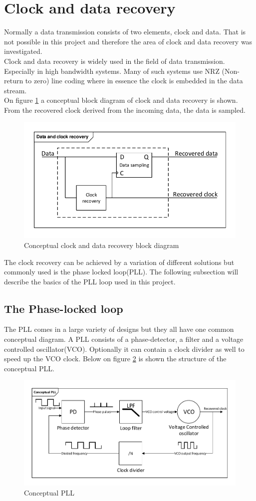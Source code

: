 \section{Clock and data recovery}
Normally a data transmission consists of two elements, clock and data. That is not possible in this project and therefore the area of clock and data recovery was investigated.\\
Clock and data recovery is widely used in the field of data transmission. Especially in high bandwidth systems. Many of such systems use NRZ (Non-return to zero) line coding where in essence the clock is embedded in the data stream.\\
On figure \ref{fig:CDR} a conceptual block diagram of clock and data recovery is shown. From the recovered clock derived from the incoming data, the data is sampled.
\begin{figure}[hbpt]
	\centering
	\includegraphics[width=.8\textwidth]{billeder/10technologystudies/CDR}
	\caption{Conceptual clock and data recovery block diagram}
	\label{fig:CDR}
\end{figure}
The clock recovery can be achieved by a variation of different solutions but commonly used is the phase locked loop(PLL). The following subsection will describe the basics of the PLL loop used in this project.
\subsection{The Phase-locked loop}
The PLL comes in a large variety of designs but they all have one common conceptual diagram. A PLL consists of a phase-detector, a filter and a voltage controlled oscillator(VCO). Optionally it can contain a clock divider as well to speed up the VCO clock. Below on figure \ref{fig:conceptualpll} is shown the structure of the conceptual PLL.
\begin{figure}[H]
	\centering
	\includegraphics[width=.9\textwidth]{billeder/10technologystudies/conceptualpll}
	\caption{Conceptual PLL}
	\label{fig:conceptualpll}
\end{figure}
